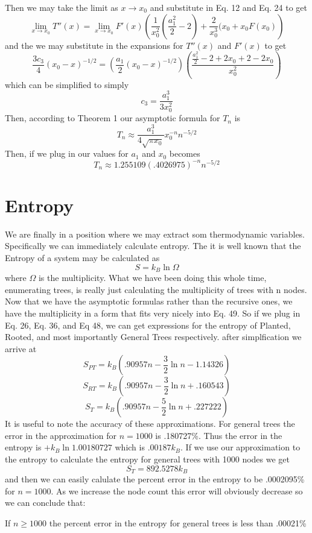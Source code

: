 \documentclass{article}
\begin{document}
Then we may take the limit as \(x \to x_0\) and substitute in Eq. 12 and Eq. 24 to get
\[\lim_{x \to x_0} T''(x)=\lim_{x \to x_0} F'(x) \left(\frac{1}{x_0^2}\left(\frac{a_1^2}{2}-2\right)+\frac{2}{x_0^3}(x_0+x_0F(x_0)\right)\]
and the we may substitute in the expansions for \(T''(x)\) and \(F'(x)\) to get
\[\frac{3c_3}{4}(x_0-x)^{-1/2}=\left(\frac{a_1}{2}(x_0-x)^{-1/2}\right)\left(\frac{\frac{a_1^2}{2}-2+2x_0+2-2x_0}{x_0^2}\right)\]
which can be simplified to simply
\begin{equation}
c_3=\frac{a_1^3}{3x_0^2}
\end{equation}
Then, according to Theorem 1 our asymptotic formula for \(T_n\) is
\begin{equation}
T_n \approx \frac{a_1^3}{4\sqrt{\pi x_0}}x_0^{-n}n^{-5/2}
\end{equation}
Then, if we plug in our values for \(a_1\) and \(x_0\) becomes
\begin{equation}
T_n \approx 1.255109(.4026975)^{-n}n^{-5/2}
\end{equation}

\section{Entropy}
We are finally in a position where we may extract som thermodynamic variables. Specifically we can immediately calculate entropy. The it is well known that the Entropy of a system may be calculated as
\begin{equation}
S=k_B \ln{\Omega}
\end{equation}
where \(\Omega\) is the multiplicity. What we have been doing this whole time, enumerating trees, is really just calculating the multiplicity of trees with n nodes. Now that we have the asymptotic formulas rather than the recursive ones, we have the multiplicity in a form that fits very nicely into Eq. 49. So if we plug in Eq. 26, Eq. 36, and Eq 48, we can get expressions for the entropy of Planted, Rooted, and most importantly General Trees respectively. after simplfication we arrive at
\begin{equation}
S_{PT}=k_B\left(.90957n-\frac{3}{2}\ln{n}-1.14326\right)
\end{equation}
\begin{equation}
S_{RT}=k_B\left(.90957n-\frac{3}{2}\ln{n}+.160543\right)
\end{equation}
\begin{equation}
S_{T}=k_B\left(.90957n-\frac{5}{2}\ln{n}+.227222\right)
\end{equation}
It is useful to note the accuracy of these approximations. For general trees the error in the approximation for \(n=1000\) is .180727\%. Thus the error in the entropy is \(+k_B\ln{1.00180727}\) which is \(.00187k_B\). If we use our approximation to the entropy to calculate the entropy for general trees with 1000 nodes we get
\[S_T=892.5278k_B\]
and then we can easily calulate the percent error in the entropy to be .0002095\% for \(n=1000\). As we increase the node count this error will obviously decrease so we can conclude that:

If \(n\geq 1000\) the percent error in the entropy for general trees is less than .00021\%
\end{document}

